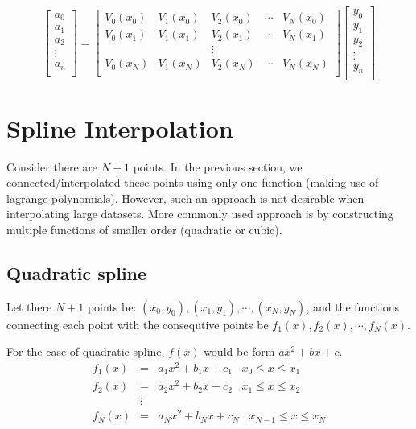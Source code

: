 \documentclass[11pt,titlepage,fleqn]{article}
\begin{document}
\begin{equation}
\begin{bmatrix}
a_0 \\
a_1 \\
a_2 \\
\vdots\\
a_n\\
\end{bmatrix} = 
\begin{bmatrix}
V_0(x_0) & V_1(x_0) &  V_2(x_0)  & \cdots & V_N(x_0)\\
V_0(x_1) & V_1(x_1) &  V_2(x_1)  & \cdots & V_N(x_1)\\
& & \vdots& &  \\
V_0(x_N) & V_1(x_N) &  V_2 (x_N) & \cdots & V_N(x_N)\\
\end{bmatrix}
\begin{bmatrix}
y_0 \\
y_1 \\
y_2 \\
\vdots\\
y_n\\
\end{bmatrix}
\end{equation}

\section{Spline Interpolation}

Consider there are $N+1$ points. In the previous section, we connected/interpolated these points using only one function (making use of lagrange polynomials). However, such an approach is not desirable when interpolating large datasets. More commonly used approach is by constructing multiple functions of smaller order (quadratic or cubic).

\subsection{Quadratic spline}
Let there $N+1$ points be: $(x_0,y_0),(x_1,y_1),\cdots,(x_N,y_N)$, and the functions connecting each point with the consequtive points be $f_1(x),f_2(x),\cdots,f_N(x)$.

For the case of quadratic spline, $f(x)$ would be form $a x^2 + bx + c$. 
\begin{eqnarray*}
f_1(x) &=& a_1 x^2 + b_1x + c_1 \,\,\,\,\, x_0 \leq x \leq x_1 \\
f_2(x) &=& a_2 x^2 + b_2x + c_2 \,\,\,\,\, x_1 \leq x \leq x_2 \\
&\vdots& \\
f_N(x) &=& a_N x^2 + b_Nx + c_N \,\,\,\,\, x_{N-1} \leq x \leq x_N
\end{eqnarray*}
\end{document}
